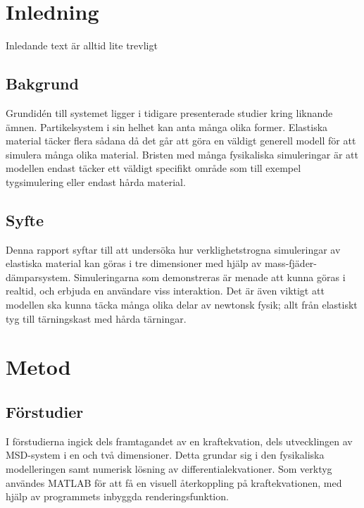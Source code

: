 \documentclass[a4paper,12pt,oneside,final,swedish]{extarticle}
\begin{document}
\pagebreak
\pagestyle{plain}
\setcounter{page}{1}

\section{Inledning}
Inledande text är alltid lite trevligt
\subsection{Bakgrund}
Grundidén till systemet ligger i tidigare presenterade studier kring liknande ämnen. Partikelsystem i sin helhet kan anta många olika former. Elastiska material täcker flera sådana då det går att göra en väldigt generell modell för att simulera många olika material. Bristen med många fysikaliska simuleringar är att modellen endast täcker ett väldigt specifikt område som till exempel tygsimulering eller endast hårda material.
\subsection{Syfte}
Denna rapport syftar till att undersöka hur verklighetstrogna simuleringar av elastiska material kan göras i tre dimensioner med hjälp av mass-fjäder-dämparsystem. Simuleringarna som demonstreras är menade att kunna göras i realtid, och erbjuda en användare viss interaktion. Det är även viktigt att modellen ska kunna täcka många olika delar av newtonsk fysik; allt från elastiskt tyg till tärningskast med hårda tärningar.

\section{Metod}
\subsection{Förstudier}
I förstudierna ingick dels framtagandet av en kraftekvation, dels utvecklingen av MSD-system i en och två dimensioner. Detta grundar sig i den fysikaliska modelleringen samt numerisk lösning av differentialekvationer. Som verktyg användes MATLAB för att få en visuell återkoppling på kraftekvationen, med hjälp av programmets inbyggda renderingsfunktion.
\end{document}
